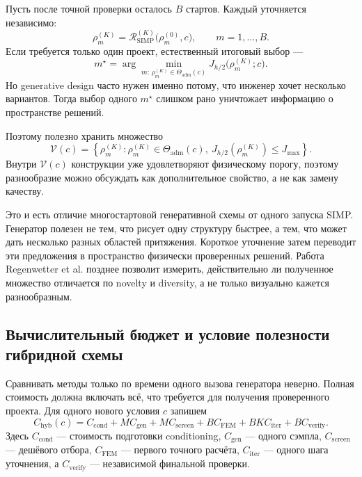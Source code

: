 Пусть после точной проверки осталось $B$ стартов. Каждый уточняется независимо:
\begin{equation}
 \rho_m^{(K)}
 =
 \mathcal R_{\mathrm{SIMP}}^{(K)}
 \bigl(\rho_m^{(0)},c\bigr),
 \qquad
 m=1,\ldots,B.
\end{equation}
Если требуется только один проект, естественный итоговый выбор ---
\begin{equation}
 m^\star
 =
 \arg\min_{
  m:\,\rho_m^{(K)}\in\Theta_{\mathrm{adm}}(c)
 }
 J_{h/2}\bigl(\rho_m^{(K)};c\bigr).
\end{equation}
Но generative design часто нужен именно потому, что инженер хочет несколько вариантов. Тогда выбор одного $m^\star$ слишком рано уничтожает информацию о пространстве решений.

Поэтому полезно хранить множество
\begin{equation}
 \mathcal V(c)
 =
 \left\{
  \rho_m^{(K)}:
  \rho_m^{(K)}\in\Theta_{\mathrm{adm}}(c),
  \ J_{h/2}(\rho_m^{(K)})\leq J_{\max}
 \right\}.
\end{equation}
Внутри $\mathcal V(c)$ конструкции уже удовлетворяют физическому порогу, поэтому разнообразие можно обсуждать как дополнительное свойство, а не как замену качеству.

Это и есть отличие многостартовой генеративной схемы от одного запуска SIMP. Генератор полезен не тем, что рисует одну структуру быстрее, а тем, что может дать несколько разных областей притяжения. Короткое уточнение затем переводит эти предложения в пространство физически проверенных решений. Работа Regenwetter et al. позднее позволит измерить, действительно ли полученное множество отличается по novelty и diversity, а не только визуально кажется разнообразным.

\subsection{Вычислительный бюджет и условие полезности гибридной схемы}

Сравнивать методы только по времени одного вызова генератора неверно. Полная стоимость должна включать всё, что требуется для получения проверенного проекта. Для одного нового условия $c$ запишем
\begin{equation}
 C_{\mathrm{hyb}}(c)
 =
 C_{\mathrm{cond}}
 +M C_{\mathrm{gen}}
 +M C_{\mathrm{screen}}
 +B C_{\mathrm{FEM}}
 +B K C_{\mathrm{iter}}
 +B C_{\mathrm{verify}}.
\end{equation}
Здесь $C_{\mathrm{cond}}$ --- стоимость подготовки conditioning, $C_{\mathrm{gen}}$ --- одного сэмпла, $C_{\mathrm{screen}}$ --- дешёвого отбора, $C_{\mathrm{FEM}}$ --- первого точного расчёта, $C_{\mathrm{iter}}$ --- одного шага уточнения, а $C_{\mathrm{verify}}$ --- независимой финальной проверки.

